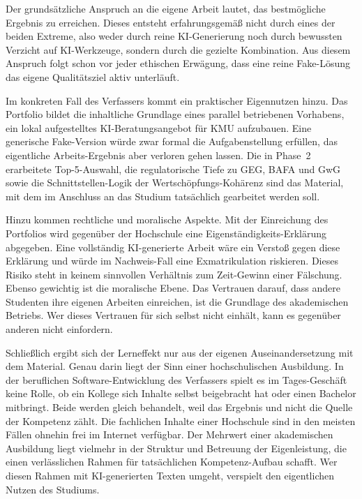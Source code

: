 \documentclass[a4paper,11pt]{article}
\begin{document}
Der grundsätzliche Anspruch an die eigene Arbeit lautet, das
bestmögliche Ergebnis zu erreichen. Dieses entsteht erfahrungsgemäß
nicht durch eines der beiden Extreme, also weder durch reine
KI-Generierung noch durch bewussten Verzicht auf KI-Werkzeuge, sondern
durch die gezielte Kombination. Aus diesem Anspruch folgt schon vor jeder
ethischen Erwägung, dass eine reine Fake-Lösung das eigene
Qualitätsziel aktiv unterläuft.

Im konkreten Fall des Verfassers kommt ein praktischer Eigennutzen
hinzu. Das Portfolio bildet die inhaltliche Grundlage eines parallel
betriebenen Vorhabens, ein lokal
aufgestelltes KI-Beratungsangebot für KMU aufzubauen. Eine generische
Fake-Version würde zwar formal die Aufgabenstellung erfüllen, das
eigentliche Arbeits-Ergebnis aber verloren gehen lassen. Die in
Phase~2 erarbeitete Top-5-Auswahl, die regulatorische Tiefe zu GEG,
BAFA und GwG sowie die Schnittstellen-Logik der Wertschöpfungs-Kohärenz
sind das Material, mit dem im Anschluss an das Studium tatsächlich
gearbeitet werden soll. 

Hinzu kommen rechtliche und moralische Aspekte. Mit der Einreichung
des Portfolios wird gegenüber der Hochschule eine
Eigenständigkeits-Erklärung abgegeben. Eine vollständig KI-generierte
Arbeit wäre ein Verstoß gegen diese Erklärung und würde im
Nachweis-Fall eine Exmatrikulation riskieren. Dieses Risiko steht in
keinem sinnvollen Verhältnis zum Zeit-Gewinn einer Fälschung. Ebenso
gewichtig ist die moralische Ebene. Das Vertrauen darauf, dass andere
Studenten ihre eigenen Arbeiten einreichen, ist die Grundlage des
akademischen Betriebs. Wer dieses Vertrauen für sich selbst nicht
einhält, kann es gegenüber anderen nicht einfordern.

Schließlich ergibt sich der Lerneffekt nur aus der eigenen
Auseinandersetzung mit dem Material. Genau darin liegt der Sinn einer
hochschulischen Ausbildung. In der beruflichen Software-Entwicklung des
Verfassers spielt es im Tages-Geschäft keine Rolle, ob ein Kollege sich
Inhalte selbst beigebracht hat oder einen Bachelor mitbringt. Beide
werden gleich behandelt, weil das Ergebnis und nicht die Quelle der
Kompetenz zählt. Die fachlichen Inhalte einer Hochschule sind in den
meisten Fällen ohnehin frei im Internet verfügbar. Der Mehrwert einer
akademischen Ausbildung liegt vielmehr in der Struktur und Betreuung
der Eigenleistung, die einen verlässlichen Rahmen für tatsächlichen
Kompetenz-Aufbau schafft. Wer diesen Rahmen mit KI-generierten Texten
umgeht, verspielt den eigentlichen Nutzen des Studiums.
\end{document}
